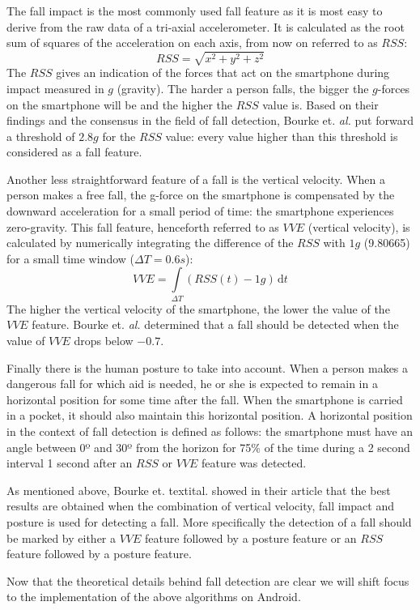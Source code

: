 \documentclass[a4paper, 10pt]{article}
\begin{document}
The fall impact is the most commonly used fall feature as it is most easy to derive from the raw data of a tri-axial accelerometer. It is calculated as the root sum of squares of the acceleration on each axis, from now on referred to as $RSS$: \[RSS = \sqrt{x^2 + y^2 + z^2}\] The $RSS$ gives an indication of the forces that act on the smartphone during impact measured in $g$ (gravity). The harder a person falls, the bigger the $g$-forces on the smartphone will be and the higher the $RSS$ value is. Based on their findings and the consensus in the field of fall detection, Bourke et. \textit{al.} put forward a threshold of $2.8g$ for the $RSS$ value: every value higher than this threshold is considered as a fall feature.

Another less straightforward feature of a fall is the vertical velocity. When a person makes a free fall, the g-force on the smartphone is compensated by the downward acceleration for a small period of time: the smartphone experiences zero-gravity. This fall feature, henceforth referred to as $VVE$ (vertical velocity), is calculated by numerically integrating the difference of the $RSS$ with $1g$ (9.80665) for a small time window ($\Delta T = 0.6s$): \[VVE = \int\limits_{\Delta T} \! (RSS(t) - 1g) \, \mathrm{d}t\] The higher the vertical velocity of the smartphone, the lower the value of the $VVE$ feature. Bourke et. \textit{al.} determined that a fall should be detected when the value of $VVE$ drops below $-0.7$.

Finally there is the human posture to take into account. When a person makes a dangerous fall for which aid is needed, he or she is expected to remain in a horizontal position for some time after the fall. When the smartphone is carried in a pocket, it should also maintain this horizontal position. A horizontal position in the context of fall detection is defined as follows: the smartphone must have an angle between 0º and 30º from the horizon for 75\% of the time during a 2 second interval 1 second after an $RSS$ or $VVE$ feature was detected.

As mentioned above, Bourke et. textit{al.} showed in their article that the best results are obtained when the combination of vertical velocity, fall impact and posture is used for detecting a fall. More specifically the detection of a fall should be marked by either a $VVE$ feature followed by a posture feature or an $RSS$ feature followed by a posture feature.

Now that the theoretical details behind fall detection are clear we will shift focus to the implementation of the above algorithms on Android.
\end{document}
